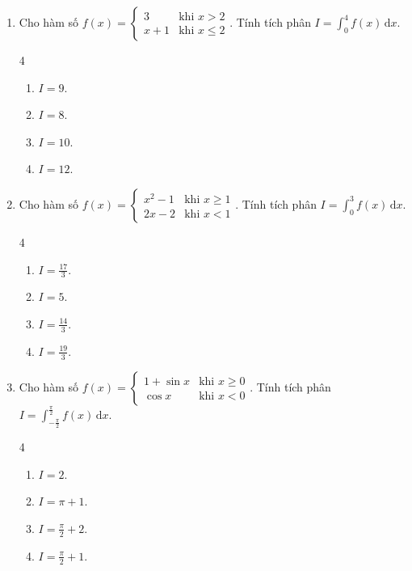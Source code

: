 \documentclass[12pt]{article}
\begin{document}
\begin{enumerate}[label=\textbf{Câu \arabic*.}]
		\item Cho hàm số $f(x) = \begin{cases} 3 & \text{khi } x > 2 \\ x + 1 & \text{khi } x \le 2 \end{cases}$. Tính tích phân $I = \displaystyle \int_{0}^{4} f(x)\,\mathrm{d}x$.
		\begin{multicols}{4}
			\begin{enumerate}[label=\textbf{\Alph*.}]
				\item $I = 9$.
				\item $I = 8$.
				\item $I = 10$.
				\item $I = 12$.
			\end{enumerate}
		\end{multicols}
		
		\item Cho hàm số $f(x) = \begin{cases} x^2 - 1 & \text{khi } x \ge 1 \\ 2x - 2 & \text{khi } x < 1 \end{cases}$. Tính tích phân $I = \displaystyle \int_{0}^{3} f(x)\,\mathrm{d}x$.
		\begin{multicols}{4}
			\begin{enumerate}[label=\textbf{\Alph*.}]
				\item $I = \frac{17}{3}$.
				\item $I = 5$.
				\item $I = \frac{14}{3}$.
				\item $I = \frac{19}{3}$.
			\end{enumerate}
		\end{multicols}
		
		\item Cho hàm số $f(x) = \begin{cases} 1 + \sin x & \text{khi } x \ge 0 \\ \cos x & \text{khi } x < 0 \end{cases}$. Tính tích phân $I = \displaystyle \int_{-\frac{\pi}{2}}^{\frac{\pi}{2}} f(x)\,\mathrm{d}x$.
		\begin{multicols}{4}
			\begin{enumerate}[label=\textbf{\Alph*.}]
				\item $I = 2$.
				\item $I = \pi + 1$.
				\item $I = \frac{\pi}{2} + 2$.
				\item $I = \frac{\pi}{2} + 1$.
			\end{enumerate}
		\end{multicols}
		

\end{enumerate}
\end{document}
